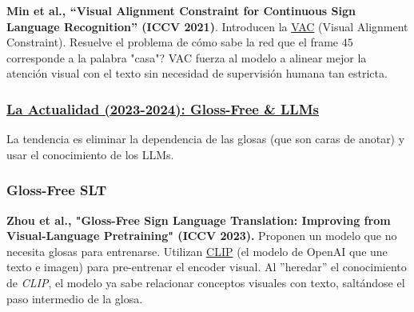\documentclass[11pt,a4paper]{article}
\begin{document}
\textbf{Min et al., ``Visual Alignment Constraint for Continuous Sign Language Recognition'' (ICCV 2021)}. Introducen la \href{https://github.com/VIPL-SLP/VAC_CSLR}{VAC} (Visual Alignment Constraint). Resuelve el problema de cómo sabe la red que el frame $45$ corresponde a la palabra "casa"? VAC fuerza al modelo a alinear mejor la atención visual con el texto sin necesidad de supervisión humana tan estricta.


\subsubsection{\underline{La Actualidad (2023-2024): Gloss-Free \& LLMs}}
La tendencia es eliminar la dependencia de las glosas (que son caras de anotar) y usar el conocimiento de los LLMs.
\subsubsection*{Gloss-Free SLT}
 \textbf{Zhou et al., "Gloss-Free Sign Language Translation: Improving from Visual-Language Pretraining" (ICCV 2023).} Proponen un modelo que no necesita glosas para entrenarse. Utilizan \href{https://openai.com/es-ES/index/clip/}{CLIP} (el modelo de OpenAI que une texto e imagen) para pre-entrenar el encoder visual. Al ''heredar'' el conocimiento de \emph{CLIP}, el modelo ya sabe relacionar conceptos visuales con texto, saltándose el paso intermedio de la glosa.
\end{document}
